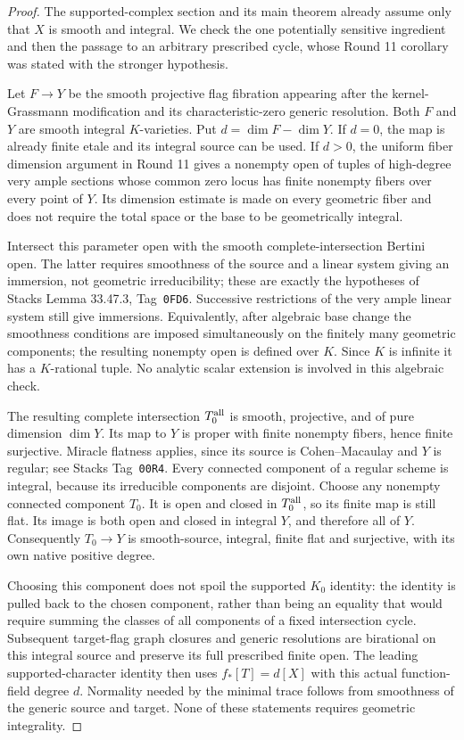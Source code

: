 \begin{proof}
The supported-complex section and its main theorem already assume
only that $X$ is smooth and integral.  We check the one potentially
sensitive ingredient and then the passage to an arbitrary prescribed
cycle, whose Round 11 corollary was stated with the stronger hypothesis.

Let $F\to Y$ be the smooth projective flag fibration appearing after
the kernel-Grassmann modification and its characteristic-zero generic
resolution.  Both $F$ and $Y$ are smooth integral $K$-varieties.
Put $d=\dim F-\dim Y$.  If $d=0$, the map is already finite etale
and its integral source can be used.  If $d>0$, the uniform fiber
dimension argument in Round 11 gives a nonempty open of tuples of
high-degree very ample sections whose common zero locus has finite
nonempty fibers over every point of $Y$.  Its dimension estimate is
made on every geometric fiber and does not require the total space
or the base to be geometrically integral.

Intersect this parameter open with the smooth complete-intersection
Bertini open.  The latter requires smoothness of the source and a
linear system giving an immersion, not geometric irreducibility;
these are exactly the hypotheses of Stacks Lemma 33.47.3,
Tag~\texttt{0FD6}.  Successive restrictions of the very ample linear
system still give immersions.  Equivalently, after algebraic base
change the smoothness conditions are imposed simultaneously on the
finitely many geometric components; the resulting nonempty open is
defined over $K$.  Since $K$ is infinite it has a $K$-rational tuple.
No analytic scalar extension is involved in this algebraic check.

The resulting complete intersection $T_0^{\rm all}$ is smooth,
projective, and of pure dimension $\dim Y$.  Its map to $Y$ is
proper with finite nonempty fibers, hence finite surjective.
Miracle flatness applies, since its source is Cohen--Macaulay and
$Y$ is regular; see Stacks Tag~\texttt{00R4}.
Every connected component of a regular scheme is integral, because
its irreducible components are disjoint.  Choose any nonempty
connected component $T_0$.  It is open and closed in
$T_0^{\rm all}$, so its finite map is still flat.  Its image is both
open and closed in integral $Y$, and therefore all of $Y$.
Consequently $T_0\to Y$ is smooth-source, integral, finite flat and
surjective, with its own native positive degree.

Choosing this component does not spoil the supported $K_0$ identity:
the identity is pulled back to the chosen component, rather than
being an equality that would require summing the classes of all
components of a fixed intersection cycle.  Subsequent target-flag
graph closures and generic resolutions are birational on this
integral source and preserve its full prescribed finite open.
The leading supported-character identity then uses
$f_*[T]=d[X]$ with this actual function-field degree $d$.
Normality needed by the minimal trace follows from smoothness of
the generic source and target.  None of these statements requires
geometric integrality.


\end{proof}
